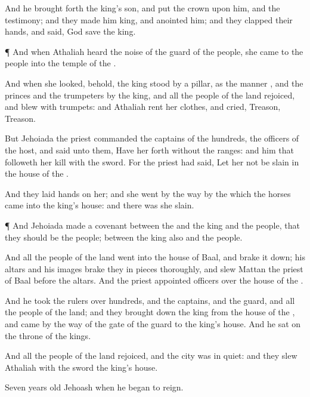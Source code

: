{And he brought
forth the
king’s
son, and
put the
crown upon him, and
{} the
testimony; and they made him
king, and
anointed him; and they
clapped their
hands, and
said, God
save the
king.


\par }{\PP {}¶ And when
Athaliah
heard the
noise of the
guard
{} of the
people, she
came to the
people into the
temple of the
{}.

And when she
looked, behold, the
king
stood by a
pillar, as the
manner
{}, and the
princes and the
trumpeters by the
king, and all the
people of the
land
rejoiced, and
blew with
trumpets: and
Athaliah
rent her
clothes, and
cried,
Treason,
Treason.

But
Jehoiada the
priest
commanded the
captains of the
hundreds, the
officers of the
host, and
said unto them, Have her
forth
without the
ranges: and him that
followeth her
kill with the
sword. For the
priest had
said, Let her not be
slain in the
house of the
{}.

And they
laid
hands on her; and she
went by the
way by the which the
horses
came into the
king’s
house: and there was she
slain.


\par }{\PP {}¶ And
Jehoiada
made a
covenant between the
{} and the
king and the
people, that they should be the
{}
people; between the
king also and the
people.

And all the
people of the
land
went into the
house of
Baal, and brake it
down; his
altars and his
images brake they in
pieces
thoroughly, and
slew
Mattan the
priest of
Baal
before the
altars. And the
priest
appointed
officers over the
house of the
{}.

And he
took the
rulers over
hundreds, and the
captains, and the
guard, and all the
people of the
land; and they brought
down the
king from the
house of the
{}, and
came by the
way of the
gate of the
guard to the
king’s
house. And he
sat on the
throne of the
kings.

And all the
people of the
land
rejoiced, and the
city was in
quiet: and they
slew
Athaliah with the
sword
{} the
king’s
house.

Seven
years
old
{}
Jehoash when he began to
reign.




}
